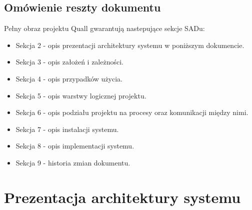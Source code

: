 \documentclass[12pt,a4paper,twoside]{article}
\begin{document}


\subsection{Omówienie reszty dokumentu}


Pełny obraz projektu Quall gwarantują nastepujące sekcje SADu:


\begin{itemize}
\item Sekcja 2 - opis prezentacji architektury systemu w poniższym dokumencie.
\item Sekcja 3 - opis założeń i zależności.
\item Sekcja 4 - opis przypadków użycia.
\item Sekcja 5 - opis warstwy logicznej projektu.
\item Sekcja 6 - opis podziału projektu na procesy oraz komunikacji między nimi.
\item Sekcja 7 - opis instalacji systemu.
\item Sekcja 8 - opis implementacji systemu.
\item Sekcja 9 - historia zmian dokumentu.
\end{itemize}

\section{Prezentacja architektury systemu}

\end{document}
